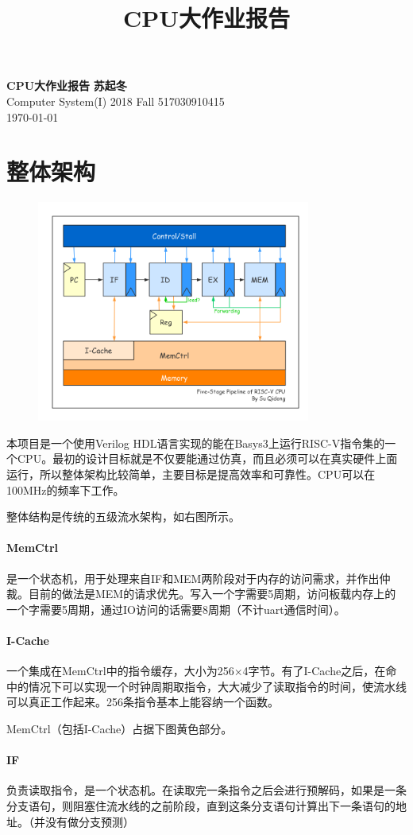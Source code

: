 \documentclass[UTF8]{ctexart}
\title{CPU大作业报告}
\begin{document}
\noindent
\large\textbf{CPU大作业报告} \hfill \textbf{苏起冬} \\
\normalsize Computer System(I) 2018 Fall \hfill 517030910415 \\
\today
	
\section{整体架构}
	\begin{figure}
	\includegraphics[width=9cm]{arch.png}
	\end{figure}

	本项目是一个使用Verilog HDL语言实现的能在Basys3上运行RISC-V指令集的一个CPU。最初的设计目标就是不仅要能通过仿真，而且必须可以在真实硬件上面运行，所以整体架构比较简单，主要目标是提高效率和可靠性。CPU可以在100MHz的频率下工作。
	
	整体结构是传统的五级流水架构，如右图所示。
	
	\paragraph{MemCtrl} 是一个状态机，用于处理来自IF和MEM两阶段对于内存的访问需求，并作出仲裁。目前的做法是MEM的请求优先。写入一个字需要5周期，访问板载内存上的一个字需要5周期，通过IO访问的话需要8周期（不计uart通信时间）。
	\paragraph{I-Cache} 一个集成在MemCtrl中的指令缓存，大小为256×4字节。有了I-Cache之后，在命中的情况下可以实现一个时钟周期取指令，大大减少了读取指令的时间，使流水线可以真正工作起来。256条指令基本上能容纳一个函数。
	
	MemCtrl（包括I-Cache）占据下图黄色部分。
	
	\paragraph{IF} 负责读取指令，是一个状态机。在读取完一条指令之后会进行预解码，如果是一条分支语句，则阻塞住流水线的之前阶段，直到这条分支语句计算出下一条语句的地址。（并没有做分支预测）
	
\end{document}
